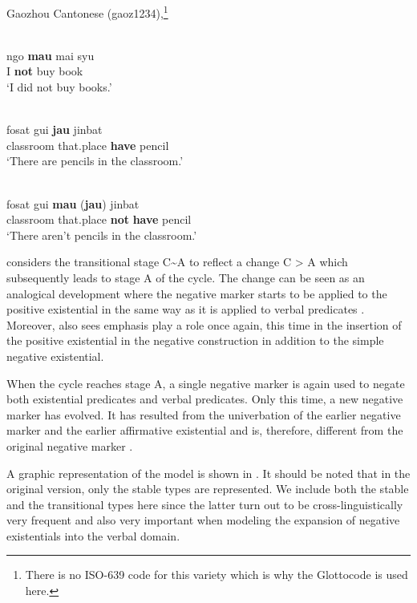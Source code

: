 \documentclass[output=paper,chinesefont,colorlinks,citecolor=brown]{langscibook}
\begin{document}
\begin{exe}
\ex Gaozhou Cantonese (gaoz1234),\footnote{There is no ISO-639 code for this variety which is why the Glottocode is used here.}  \label{ex:gaozhou1}

\begin{xlist}
 \label{ex:gaozhou1a}\\
\gll ngo \textbf{mau} mai syu\\
I \textbf{not} buy book\\
\glt `I did not buy books.'

 \label{ex:gaozhou1b}\\
\gll fosat gui \textbf{jau} jinbat\\	
classroom that.place \textbf{have} pencil\\
\glt `There are pencils in the classroom.'

\label{ex:gaozhou1c}\\
\gll fosat gui \textbf{mau} (\textbf{jau}) jinbat\\
 classroom that.place \textbf{not} \textbf{have} pencil\\
\glt `There aren't pencils in the classroom.'

\end{xlist}
\end{exe}
\citet[13]{Croft1991} considers the transitional stage C{\textasciitilde}A to reflect a change C > A which subsequently leads to stage A of the cycle. The change can be seen as an analogical development where the negative marker starts to be applied to the positive existential in the same way as it is applied to verbal predicates \citet[17]{Croft1991}. Moreover, \citet[22]{Croft1991} also sees emphasis play a role once again, this time in the insertion of the positive existential in the negative construction in addition to the simple negative existential.

When the cycle reaches stage A, a single negative marker is again used to negate both existential predicates and verbal predicates. Only this time, a new negative marker has evolved. It has resulted from the univerbation of the earlier negative marker and the earlier affirmative existential and is, therefore, different from the original negative marker \citep[6--13]{Croft1991}.

A graphic representation of the model is shown in . It should be noted that in the original version, only the stable types are represented. We include both the stable and the transitional types here since the latter turn out to be cross-linguistically very frequent and also very important when modeling the expansion of negative existentials into the verbal domain.
\end{document}
